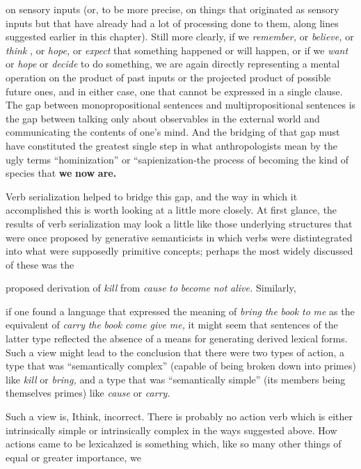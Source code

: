 on sensory inputs (or, to be more precise, on things that originated as sensory inputs but that have already had a lot of processing done to them, along lines suggested earlier in this chapter). Still more clearly, if we \textit{remember,} or \textit{believe,} or \textit{think} , or \textit{hope,} or \textit{expect} that something happened or will happen, or if we \textit{want} or \textit{hope} or \textit{decide} to do some\-thing, we are again directly representing a mental operation on the product of past inputs or the projected product of possible future ones, and in either case, one that cannot be expressed in a single clause. The gap between monopropositional sentences and multipropositional sentences is the gap between talking only about observables in the external world and communicating the contents of one's mind. And the bridging of that gap must have constituted the greatest single step in what anthropologists mean by the ugly terms ``hominization'' or ``sapienization{\textquotedbl}{}-the process of becoming the kind of species that \textbf{we} \textbf{now} \textbf{are.}

Verb serialization helped to bridge this gap, and the way in which it accomplished this is worth looking at a little more closely. At first glance, the results of verb serialization may look a little like those underlying structures that were once proposed by generative semanti\-cists in which verbs were distintegrated into what were supposedly primitive concepts; perhaps the most widely discussed of these was the

proposed derivation of \textit{kill} from \textit{cause} \textit{to} \textit{become} \textit{not} \textit{alive.} Similarly,

if one found a language that expressed the meaning of \textit{bring} \textit{the} \textit{book} \textit{to} \textit{me} as the equivalent of \textit{carry} \textit{the} \textit{book} \textit{come} \textit{give} \textit{me,} it might seem that sentences of the latter type reflected the absence of a means for generating derived lexical forms. Such a view might lead to the conclu\-sion that there were two types of action, a type that was ``semantically complex'' (capable of being broken down into primes) like \textit{kill }or \textit{bring,} and a type that was ``semantically simple'' (its members being themselves primes) like \textit{cause} or \textit{carry.}

Such a view is, Ithink, incorrect. There is probably no action verb which is either intrinsically simple or intrinsically complex in the ways suggested above. How actions came to be lexicahzed is something which, like so many other things of equal or greater importance, we

